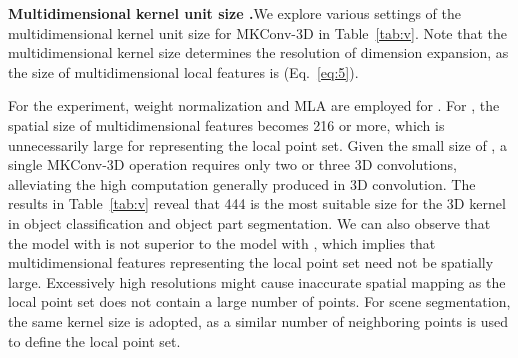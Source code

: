 \documentclass[preprint,12pt]{elsarticle}
\begin{document}
\medskip
\noindent\textbf{Multidimensional kernel unit size .}\hspace{0.3cm}We explore various settings of the multidimensional kernel unit size  for MKConv-3D in Table~\ref{tab:v}. Note that the multidimensional kernel size determines the resolution of dimension expansion, as the size of multidimensional local features  is  (Eq.~\ref{eq:5}). 
\begin{comment}
\begin{table}[t]
\caption{3D convolution kernel sizes used for the experiment in Table~\ref{tab:v}. "cls" and "seg" denote classification and segmentation, respectively. Different 3D convolution kernel sizes are used in the case of  for classification and segmentation networks.}
\vspace{-0.3cm}
\begin{center}
\begin{tabular}{c|ccc}
\toprule
multidimensional kernel size  & \multicolumn{3}{c}{3D convolution kernel size} \\ 
 & 1st kernel & 2nd kernel & 3rd kernel \\
\midrule
\midrule
3  3  3 &   2  2  2  & 2  2  2 & -\\
4  4  4 (cls) &  3  3  3 & 2  2  2 & -\\
4  4  4 (seg) &  2  2  2 & 2  2  2 & 2  2  2\\
5  5  5  & 3  3  3 & 2  2  2 & 2  2  2\\
\bottomrule
\end{tabular}
\label{tab:kernel}
\end{center}
\end{table}
\end{comment}

For the experiment, weight normalization and MLA are employed for . For , the spatial size of multidimensional features becomes 216 or more, which is unnecessarily large for representing the local point set. Given the small size of , a single MKConv-3D operation requires only two or three 3D convolutions, alleviating the high computation generally produced in 3D convolution. The results in Table~\ref{tab:v} reveal that 444 is the most suitable size for the 3D kernel in object classification and object part segmentation. We can also observe that the model with  is not superior to the model with , which implies that multidimensional features representing the local point set need not be spatially large. Excessively high resolutions might cause inaccurate spatial mapping as the local point set does not contain a large number of points. For scene segmentation, the same kernel size  is adopted, as a similar number of neighboring points  is used to define the local point set.
\end{document}
